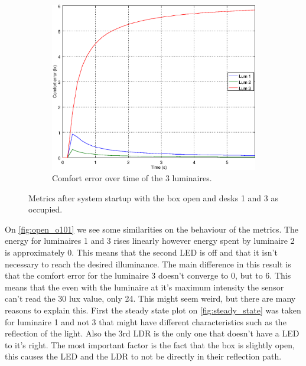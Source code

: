 \begin{figure}[ht]
\begin{subfigure}[t]{0.32\textwidth}
    \centering
    \includegraphics[width=.95\textwidth]{img/n_open_o101}
    \caption{Comfort error over time of the 3 luminaires.}
    \label{fig:n_open_o101}
    \end{subfigure}
    \caption{Metrics after system startup with the box open and desks 1 and 3 as occupied.}
    \label{fig:open_o101}
\end{figure}


On \autoref{fig:open_o101} we see some similarities on the behaviour of the metrics. The energy for luminaires 1 and 3 rises linearly however energy spent by luminaire 2 is approximately 0. This means that the second LED is off and that it isn't necessary to reach the desired illuminance. The main difference in this result is that the comfort error for the luminaire 3 doesn't converge to 0, but to 6. This means that the even with the luminaire at it's maximum intensity the sensor can't read the 30 lux value, only 24. This might seem weird, but there are many reasons to explain this. First the steady state plot on \autoref{fig:steady_state} was taken for luminaire 1 and not 3 that might have different characteristics such as the reflection of the light. Also the 3rd LDR is the only one that doesn't have a LED to it's right. The most important factor is the fact that the box is slightly open, this causes the LED and the LDR to not be directly in their reflection path.

